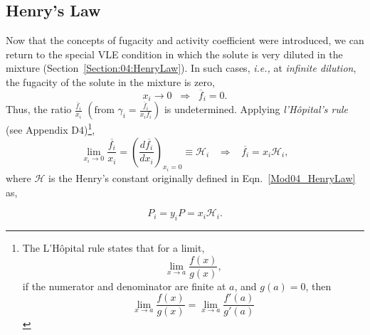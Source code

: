 \documentclass[12pts,a4paper,amsmath,amssymb,floatfix]{article}%
\newcommand{\frc}{\displaystyle\frac}
\newcommand{\ie}{{\it i.e., }}
\begin{document}
\subsection{Henry's Law}\label{Section:05:HenryLaw}
      Now that the concepts of fugacity and activity coefficient were introduced, we can return to the special VLE condition in which the solute is very diluted in the mixture (Section~\ref{Section:04:HenryLaw}). In such cases,  \ie at {\it infinite dilution}, the fugacity of the solute in the mixture is zero, 
         \begin{displaymath}
                x_{i} \rightarrow 0 \;\;\Rightarrow \;\; \overline{f}_{i} = 0.
         \end{displaymath}
      Thus, the ratio $\frac{\overline{f}_{i}}{x_{i}}$ $\left(\text{from } \gamma_{i}=\frac{\overline{f}_{i}}{x_{i}f_{i}}\right)$ is undetermined. Applying {\it l'H\^opital's rule} (see Appendix D4)\footnote{The L'H\^opital rule states that for a limit,
         \begin{displaymath}
                 \lim\limits_{x\rightarrow a}\frc{f(x)}{g(x)},
         \end{displaymath}
         if the numerator and denominator are finite at $a$, and $g(a)=0$, then
         \begin{displaymath}
                 \lim\limits_{x\rightarrow a}\frc{f(x)}{g(x)} =  \lim\limits_{x\rightarrow a}\frc{f'(a)}{g'(a)}
         \end{displaymath}
     },
         \begin{equation}
             \lim\limits_{x_{i}\rightarrow 0}\frc{\overline{f_{i}}}{x_{i}} = \left(\frc{d \overline{f_{i}}}{d x_{i}}\right)_{x_{i}=0} \equiv \mathcal{H}_{i}\;\;\;\Rightarrow\;\;\; \overline{f_{i}} = x_{i}\mathcal{H}_{i},\label{Mod05_HenryLaw1} 
         \end{equation}
         where $\mathcal{H}$ is the Henry's constant originally defined in Eqn.~\ref{Mod04_HenryLaw} as,
         \begin{shaded}
           \begin{displaymath}
             P_{i} = y_{i}P = x_{i}\mathcal{H}_{i}.
           \end{displaymath}
        \end{shaded}
%

      
\end{document}
